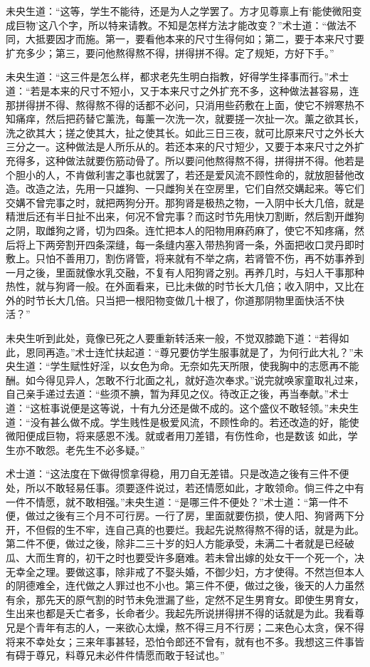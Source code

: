 \documentclass[a4paper,12pt,UTF8,twoside]{ctexbook}
\begin{document}
未央生道：“这等，学生不能待，还是为人之学罢了。方才见尊禀上有‘能使微阳变成巨物’这八个字，所以特来请教。不知是怎样方法才能改变？”术士道：“做法不同，大抵要因才而施。第一，要看他本来的尺寸生得何如；第二，要于本来尺寸要扩充多少；第三，要问他熬得熬不得，拼得拼不得。定了规矩，方好下手。”

未央生道：“这三件是怎么样，都求老先生明白指教，好得学生择事而行。”术士道：“若是本来的尺寸不短小，又于本来尺寸之外扩充不多，这种做法甚容易，连那拼得拼不得、熬得熬不得的话都不必问，只消用些药敷在上面，使它不辨寒热不知痛痒，然后把药替它薰洗，每薰一次洗一次，就要搓一次扯一次。薰之欲其长，洗之欲其大；搓之使其大，扯之使其长。如此三日三夜，就可比原来尺寸之外长大三分之一。这种做法是人所乐从的。若还本来的尺寸短少，又要于本来尺寸之外扩充得多，这种做法就要伤筋动骨了。所以要问他熬得熬不得，拼得拼不得。他若是个胆小的人，不肯做利害之事也就罢了，若还是爱风流不顾性命的，就放胆替他改造。改造之法，先用一只雄狗、一只雌狗关在空房里，它们自然交媾起来。等它们交媾不曾完事之时，就把两狗分开。那狗肾是极热之物，一入阴中长大几倍，就是精泄后还有半日扯不出来，何况不曾完事？而这时节先用快刀割断，然后割开雌狗之阴，取雌狗之肾，切为四条。连忙把本人的阳物用麻药麻了，使它不知疼痛，然后将上下两旁割开四条深缝，每一条缝内塞入带热狗肾一条，外面把收口灵丹即时敷上。只怕不善用刀，割伤肾管，将来就有不举之病，若肾管不伤，再不妨事养到一月之後，里面就像水乳交融，不复有人阳狗肾之别。再养几时，与妇人干事那种热性，就与狗肾一般。在外面看来，已比未做的时节长大几倍；收入阴中，又比在外的时节长大几倍。只当把一根阳物变做几十根了，你道那阴物里面快活不快活？”

未央生听到此处，竟像已死之人要重新转活来一般，不觉双膝跪下道：“若得如此，恩同再造。”术士连忙扶起道：“尊兄要仿学生服事就是了，为何行此大礼？”未央生道：“学生赋性好淫，以女色为命。无奈如先天所限，使我胸中的志愿再不能酬。如今得见异人，怎敢不行北面之礼，就好造次奉求。”说完就唤家童取礼过来，自己亲手递过去道：“些须不腆，暂为拜见之仪。待改正之後，再当奉献。”术士道：“这桩事说便是这等说，十有九分还是做不成的。这个盛仪不敢轻领。”未央生道：“没有甚么做不成。学生贱性是极爱风流，不顾性命的。若还改造的好，能使微阳便成巨物，将来感恩不浅。就或者用刀差错，有伤性命，也是数该
如此，学生亦不敢怨。老先生不必多疑。”

术士道：“这法度在下做得惯拿得稳，用刀自无差错。只是改造之後有三件不便处，所以不敢轻易任事。须要逐件说过，若还情愿如此，才敢领命。倘三件之中有一件不情愿，就不敢相强。”未央生道：“是哪三件不便处？”术士道：“第一件不便，做过之後有三个月不可行房。一行了房，里面就要伤损，使人阳、狗肾两下分开，不但假的生不牢，连自己真的也要烂。我起先说熬得熬不得的话，就是为此。第二件不便，做过之後，除非二三十岁的妇人方能承受，未满二十者就是已经破瓜、大而生育的，初干之时也要受许多磨难。若未曾出嫁的处女干一个死一个，决无幸全之理。要做这事，除非戒了不娶头婚，不御少妇，方才使得。不然岂但本人的阴德难全，连代做之人罪过也不小也。第三件不便，做过之後，後天的人力虽然有余，那先天的原气割的时节未免泄漏了些，定然不足生男育女。即使生男育女，生出来也都是夭亡者多，长命者少。我起先所说拼得拼不得的话就是为此。我看尊兄是个青年有志的人，一来欲心太燥，熬不得三月不行房；二来色心太贪，保不得将来不幸处女；三来年事甚轻，恐怕令郎还不曾有，就有也不多。我想这三件事皆有碍于尊兄，料尊兄未必件件情愿而敢于轻试也。”
\end{document}
